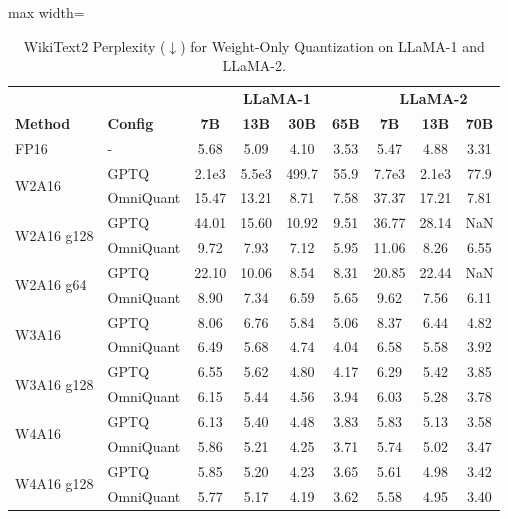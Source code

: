 \begin{table}[htbp]
\centering
\caption{WikiText2 Perplexity ($\downarrow$) for Weight-Only Quantization on LLaMA-1 and LLaMA-2.}
\label{tab:llama1-2-weight-merged}
\begin{adjustbox}{max width=\textwidth}
  \begin{tabular}{ll|cccc|ccc}
    \toprule
    & & \multicolumn{4}{c|}{\textbf{LLaMA-1}} & \multicolumn{3}{c}{\textbf{LLaMA-2}} \\
    \textbf{Method} & \textbf{Config} & \textbf{7B} & \textbf{13B} & \textbf{30B} & \textbf{65B} & \textbf{7B} & \textbf{13B} & \textbf{70B} \\
    \midrule
    FP16 & - & 5.68 & 5.09 & 4.10 & 3.53 & 5.47 & 4.88 & 3.31 \\
    \midrule
    \multirow{2}{*}{W2A16}
    & GPTQ & 2.1e3 & 5.5e3 & 499.7 & 55.9 & 7.7e3 & 2.1e3 & 77.9 \\
    & OmniQuant & 15.47 & 13.21 & 8.71 & 7.58 & 37.37 & 17.21 & 7.81 \\
    \midrule
    \multirow{2}{*}{W2A16 g128}
    & GPTQ & 44.01 & 15.60 & 10.92 & 9.51 & 36.77 & 28.14 & NaN \\
    & OmniQuant & 9.72 & 7.93 & 7.12 & 5.95 & 11.06 & 8.26 & 6.55 \\
    \midrule
    \multirow{2}{*}{W2A16 g64}
    & GPTQ & 22.10 & 10.06 & 8.54 & 8.31 & 20.85 & 22.44 & NaN \\
    & OmniQuant & 8.90 & 7.34 & 6.59 & 5.65 & 9.62 & 7.56 & 6.11 \\
    \midrule
    \multirow{2}{*}{W3A16}
    & GPTQ & 8.06 & 6.76 & 5.84 & 5.06 & 8.37 & 6.44 & 4.82 \\
    & OmniQuant & 6.49 & 5.68 & 4.74 & 4.04 & 6.58 & 5.58 & 3.92 \\
    \midrule
    \multirow{2}{*}{W3A16 g128}
    & GPTQ & 6.55 & 5.62 & 4.80 & 4.17 & 6.29 & 5.42 & 3.85 \\
    & OmniQuant & 6.15 & 5.44 & 4.56 & 3.94 & 6.03 & 5.28 & 3.78 \\
    \midrule
    \multirow{2}{*}{W4A16}
    & GPTQ & 6.13 & 5.40 & 4.48 & 3.83 & 5.83 & 5.13 & 3.58 \\
    & OmniQuant & 5.86 & 5.21 & 4.25 & 3.71 & 5.74 & 5.02 & 3.47 \\
    \midrule
    \multirow{2}{*}{W4A16 g128}
    & GPTQ & 5.85 & 5.20 & 4.23 & 3.65 & 5.61 & 4.98 & 3.42 \\
    & OmniQuant & 5.77 & 5.17 & 4.19 & 3.62 & 5.58 & 4.95 & 3.40 \\
    \bottomrule
  \end{tabular}
\end{adjustbox}
\end{table}
\newpage
{}

